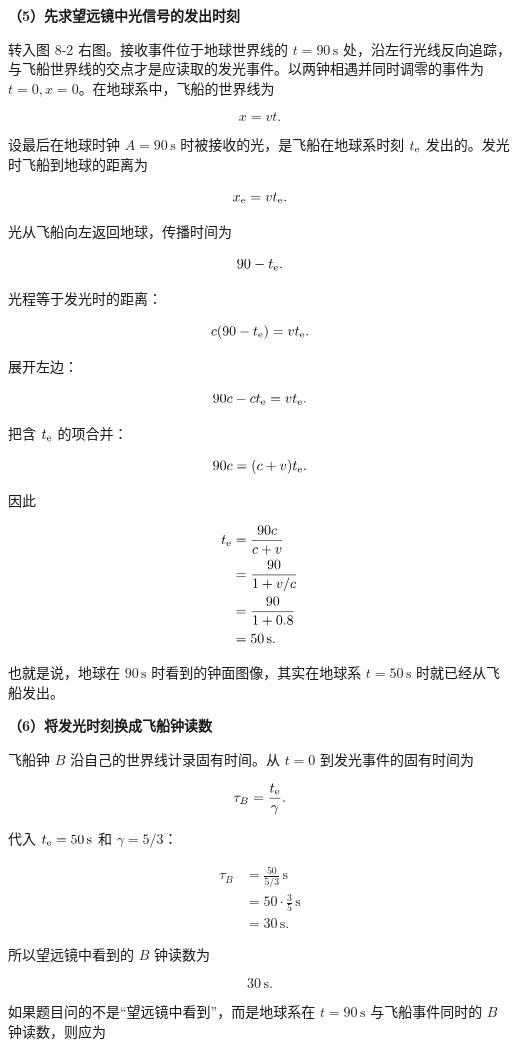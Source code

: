 \documentclass[12pt,a4paper,UTF8]{ctexart}
\begin{document}
\textbf{（5）先求望远镜中光信号的发出时刻}

转入图 8-2 右图。接收事件位于地球世界线的 \(t=90\,\mathrm s\)
处，沿左行光线反向追踪，与飞船世界线的交点才是应读取的发光事件。以两钟相遇并同时调零的事件为
\(t=0,x=0\)。在地球系中，飞船的世界线为

\[
x=vt.
\]

设最后在地球时钟 \(A=90\,\mathrm s\) 时被接收的光，是飞船在地球系时刻
\(t_{\rm e}\) 发出的。发光时飞船到地球的距离为

\[
x_{\rm e}=vt_{\rm e}.
\]

光从飞船向左返回地球，传播时间为

\[
90-t_{\rm e}.
\]

光程等于发光时的距离：

\[
c(90-t_{\rm e})=vt_{\rm e}.
\]

展开左边：

\[
90c-ct_{\rm e}=vt_{\rm e}.
\]

把含 \(t_{\rm e}\) 的项合并：

\[
90c=(c+v)t_{\rm e}.
\]

因此

\[
\begin{aligned}
t_{\rm e}
&=\frac{90c}{c+v}\\
&=\frac{90}{1+v/c}\\
&=\frac{90}{1+0.8}\\
&=50\,\mathrm s.
\end{aligned}
\]

也就是说，地球在 \(90\,\mathrm s\) 时看到的钟面图像，其实在地球系
\(t=50\,\mathrm s\) 时就已经从飞船发出。

\textbf{（6）将发光时刻换成飞船钟读数}

飞船钟 \(B\) 沿自己的世界线计录固有时间。从 \(t=0\)
到发光事件的固有时间为

\[
\tau_B=\frac{t_{\rm e}}{\gamma}.
\]

代入 \(t_{\rm e}=50\,\mathrm s\) 和 \(\gamma=5/3\)：

\[
\begin{aligned}
\tau_B
&=\frac{50}{5/3}\,\mathrm s\\
&=50\cdot\frac35\,\mathrm s\\
&=30\,\mathrm s.
\end{aligned}
\]

所以望远镜中看到的 \(B\) 钟读数为

\[
\boxed{30\,\mathrm s}.
\]

如果题目问的不是``望远镜中看到''，而是地球系在 \(t=90\,\mathrm s\)
与飞船事件同时的 \(B\) 钟读数，则应为
\end{document}
